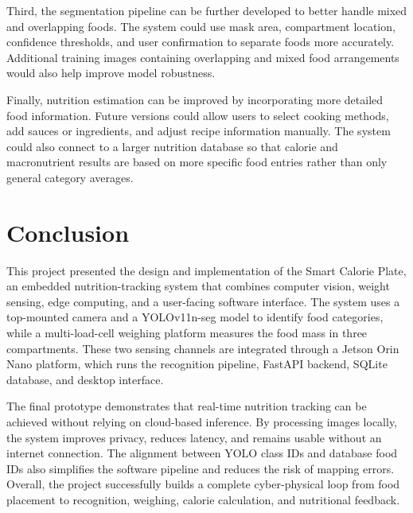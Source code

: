 \documentclass[11pt,a4paper]{article}
\begin{document}
Third, the segmentation pipeline can be further developed to better handle mixed and overlapping foods. The system could use mask area, compartment location, confidence thresholds, and user confirmation to separate foods more accurately. Additional training images containing overlapping and mixed food arrangements would also help improve model robustness.

Finally, nutrition estimation can be improved by incorporating more detailed food information. Future versions could allow users to select cooking methods, add sauces or ingredients, and adjust recipe information manually. The system could also connect to a larger nutrition database so that calorie and macronutrient results are based on more specific food entries rather than only general category averages.

\section{Conclusion}

This project presented the design and implementation of the Smart Calorie Plate, an embedded nutrition-tracking system that combines computer vision, weight sensing, edge computing, and a user-facing software interface. The system uses a top-mounted camera and a YOLOv11n-seg model to identify food categories, while a multi-load-cell weighing platform measures the food mass in three compartments. These two sensing channels are integrated through a Jetson Orin Nano platform, which runs the recognition pipeline, FastAPI backend, SQLite database, and desktop interface.

The final prototype demonstrates that real-time nutrition tracking can be achieved without relying on cloud-based inference. By processing images locally, the system improves privacy, reduces latency, and remains usable without an internet connection. The alignment between YOLO class IDs and database food IDs also simplifies the software pipeline and reduces the risk of mapping errors. Overall, the project successfully builds a complete cyber-physical loop from food placement to recognition, weighing, calorie calculation, and nutritional feedback.
\end{document}
